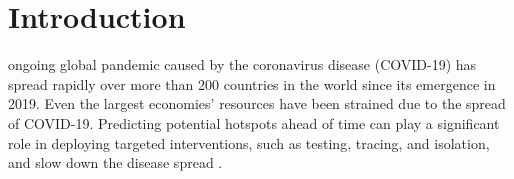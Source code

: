 \documentclass[journal]{IEEEtran}
\begin{document}
%
\IEEEpeerreviewmaketitle



\section{Introduction}

 ongoing global pandemic caused by the coronavirus disease (COVID-19) has spread rapidly over more than 200 countries in the world since its emergence in 2019. 
Even the largest economies' resources have been strained due to the spread of COVID-19. 
Predicting potential hotspots ahead of time can play a significant role in deploying targeted interventions, such as testing, tracing, and isolation, and slow down the disease spread \cite{oster2020trends}. 
\end{document}
